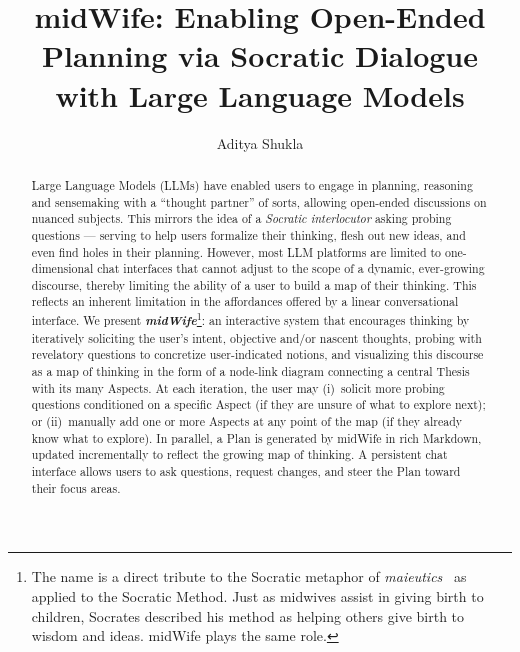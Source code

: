 \documentclass[sigconf]{acmart}
\begin{document}
\title{midWife: Enabling Open-Ended Planning via Socratic Dialogue with Large Language Models}

\author{Aditya Shukla}

\renewcommand{\shortauthors}{Shukla}

\begin{abstract}
Large Language Models (LLMs) have enabled users to engage in planning, reasoning
and sensemaking with a ``thought partner'' of sorts, allowing open-ended discussions
on nuanced subjects. This mirrors the idea of a \textit{Socratic interlocutor}
asking probing questions --- serving to help users formalize their thinking, flesh
out new ideas, and even find holes in their planning. However, most LLM platforms
are limited to one-dimensional chat interfaces that cannot adjust to the scope of a
dynamic, ever-growing discourse, thereby limiting the ability of a user to build a
map of their thinking. This reflects an inherent limitation in the affordances offered
by a linear conversational interface. We present \textbf{\textit{midWife}}\footnote{The name is a direct tribute to the Socratic metaphor of
\textit{maieutics}~\cite{plato_theaetetus} as applied to the Socratic Method. Just as midwives assist in giving birth
to children, Socrates described his method as helping others give birth to wisdom and
ideas. midWife plays the same role.}: an interactive
system that encourages thinking by iteratively soliciting the user's intent, objective
and/or nascent thoughts, probing with revelatory questions to concretize
user-indicated notions, and visualizing this discourse as a map of thinking in the
form of a node-link diagram connecting a central Thesis with its many Aspects. At
each iteration, the user may (i)~solicit more probing questions conditioned on a
specific Aspect (if they are unsure of what to explore next); or (ii)~manually add
one or more Aspects at any point of the map (if they already know what to explore).
In parallel, a Plan is generated by midWife in rich Markdown, updated incrementally
to reflect the growing map of thinking. A persistent chat interface allows users to
ask questions, request changes, and steer the Plan toward their focus areas.
\end{abstract}
\end{document}
